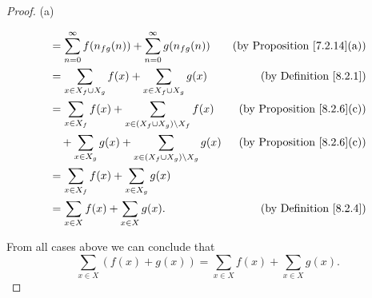 \begin{proof}{(a)}
\begin{enumerate}[label=(\Roman*)]
\begin{align*}
                   & = \sum_{n = 0}^\infty f(n_{fg}(n)) + \sum_{n = 0}^\infty g(n_{fg}(n))                      & \text{(by Proposition \ref{7.2.14}(a))} \\
                   & = \sum_{x \in X_f \cup X_g} f(x) + \sum_{x \in X_f \cup X_g} g(x)                          & \text{(by Definition \ref{8.2.1})}      \\
                   & = \sum_{x \in X_f} f(x) + \sum_{x \in (X_f \cup X_g) \setminus X_f} f(x)                   & \text{(by Proposition \ref{8.2.6}(c))}  \\
                   & \quad + \sum_{x \in X_g} g(x) + \sum_{x \in (X_f \cup X_g) \setminus X_g} g(x)             & \text{(by Proposition \ref{8.2.6}(c))}  \\
                   & = \sum_{x \in X_f} f(x) + \sum_{x \in X_g} g(x)                                                                                      \\
                   & = \sum_{x \in X} f(x) + \sum_{x \in X} g(x).                                               & \text{(by Definition \ref{8.2.4})}
              \end{align*}
    \end{enumerate}
    From all cases above we can conclude that
    \[
        \sum_{x \in X} (f(x) + g(x)) = \sum_{x \in X} f(x) + \sum_{x \in X} g(x).
    \]
\end{proof}

